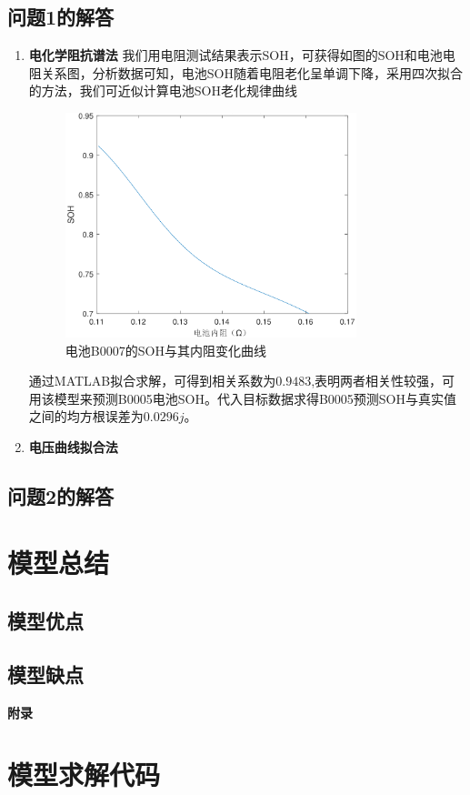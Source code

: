 \documentclass{cumcm}
\begin{document}
\subsection{问题1的解答}
\begin{enumerate}[(1)]
\item \textbf{电化学阻抗谱法}
我们用电阻测试结果表示SOH，可获得如图的SOH和电池电阻关系图，分析数据可知，电池SOH随着电阻老化呈单调下降，采用四次拟合的方法，我们可近似计算电池SOH老化规律曲线
\begin{figure}[H]
\centering
\includegraphics[width=0.8\textwidth]{img/SOH-R-fit.png}
\caption{电池B0007的SOH与其内阻变化曲线}
\end{figure}
通过MATLAB拟合求解，可得到相关系数为$0.9483$,表明两者相关性较强，可用该模型来预测B0005电池SOH。代入目标数据求得B0005预测SOH与真实值之间的均方根误差为$0.0296j$。
\item \textbf{电压曲线拟合法}

\end{enumerate}
\subsection{问题2的解答}


\section{模型总结}

\subsection{模型优点}

\subsection{模型缺点}





\newpage
\appendix
\textbf{附录}
\section{模型求解代码}
\end{document}

